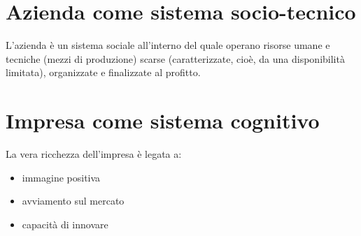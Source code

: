 \section{Azienda come sistema socio-tecnico}

L’azienda è un sistema sociale all’interno del quale
operano risorse umane e tecniche (mezzi di produzione)
scarse (caratterizzate, cioè, da una disponibilità limitata),
organizzate e finalizzate al profitto.

\section{Impresa come sistema cognitivo}

La vera ricchezza dell'impresa è legata a:
\begin{itemize}
    \item immagine positiva
    \item avviamento sul mercato
    \item capacità di innovare
\end{itemize}


